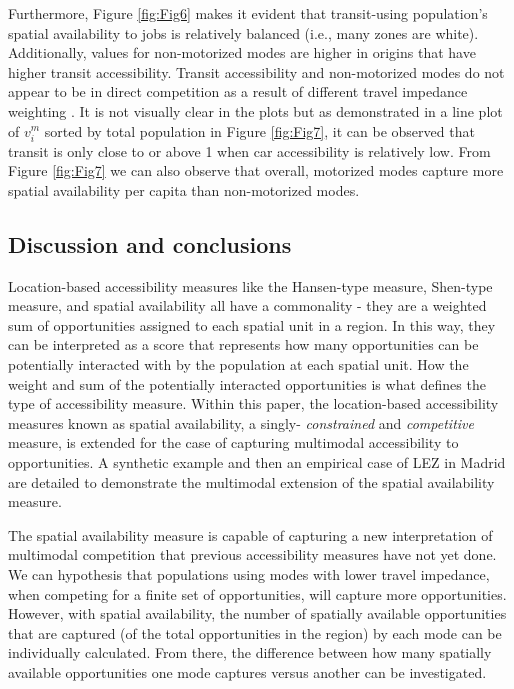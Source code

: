 \documentclass[]{trbunofficial}
\begin{document}
Furthermore, Figure \ref{fig:Fig6} makes it evident that transit-using
population's spatial availability to jobs is relatively balanced (i.e.,
many zones are white). Additionally, values for non-motorized modes are
higher in origins that have higher transit accessibility. Transit
accessibility and non-motorized modes do not appear to be in direct
competition as a result of different travel impedance weighting . It is
not visually clear in the plots but as demonstrated in a line plot of
\(v_i^m\) sorted by total population in Figure \ref{fig:Fig7}, it can be
observed that transit is only close to or above 1 when car accessibility
is relatively low. From Figure \ref{fig:Fig7} we can also observe that
overall, motorized modes capture more spatial availability per capita
than non-motorized modes.

\hypertarget{discussion-and-conclusions}{%
\subsection{Discussion and
conclusions}\label{discussion-and-conclusions}}

Location-based accessibility measures like the Hansen-type measure,
Shen-type measure, and spatial availability all have a commonality -
they are a weighted sum of opportunities assigned to each spatial unit
in a region. In this way, they can be interpreted as a score that
represents how many opportunities can be potentially interacted with by
the population at each spatial unit. How the weight and sum of the
potentially interacted opportunities is what defines the type of
accessibility measure. Within this paper, the location-based
accessibility measures known as spatial availability, a singly-
\emph{constrained} and \emph{competitive} measure, is extended for the
case of capturing multimodal accessibility to opportunities. A synthetic
example and then an empirical case of LEZ in Madrid are detailed to
demonstrate the multimodal extension of the spatial availability
measure.

The spatial availability measure is capable of capturing a new
interpretation of multimodal competition that previous accessibility
measures have not yet done. We can hypothesis that populations using
modes with lower travel impedance, when competing for a finite set of
opportunities, will capture more opportunities. However, with spatial
availability, the number of spatially available opportunities that are
captured (of the total opportunities in the region) by each mode can be
individually calculated. From there, the difference between how many
spatially available opportunities one mode captures versus another can
be investigated.
\end{document}
